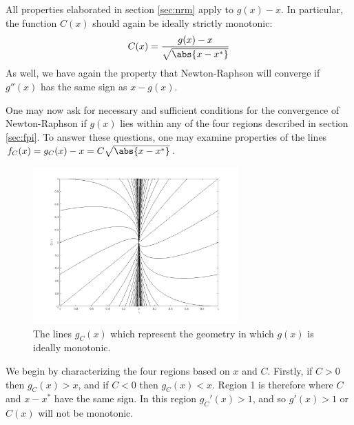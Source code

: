 \documentclass{article}
\begin{document}
All properties elaborated in section \ref{sec:nrm} apply to $g(x) - x$.
In particular, the function $C(x)$ should again be ideally strictly monotonic:
\begin{equation*}
C(x) = \frac{g(x) - x}{\sqrt{\abs{x-x^*}}}
\end{equation*}
As well, we have again the property that Newton-Raphson will converge if $g''(x)$ has the same sign as $x-g(x)$.

One may now ask for necessary and sufficient conditions for the convergence of Newton-Raphson if $g(x)$ lies within any of the four regions described in section \ref{sec:fpi}.
To answer these questions, one may examine properties of the lines $f_C(x) = g_C(x) - x = C \sqrt{\abs{x-x^*}}$.

\begin{figure}
\centering
\includegraphics[width=0.7\textwidth]{clines.png}
\caption{The lines $g_C(x)$ which represent the geometry in which $g(x)$ is ideally monotonic.}
\label{fig:Clines}
\end{figure}

We begin by characterizing the four regions based on $x$ and $C$.
Firstly, if $C > 0$ then $g_C(x) > x$, and if $C<0$ then $g_C(x) < x$.
Region 1 is therefore where $C$ and $x-x^*$ have the same sign.
In this region $g_C'(x) > 1$, and so $g'(x) > 1$ or $C(x)$ will not be monotonic.
\end{document}
